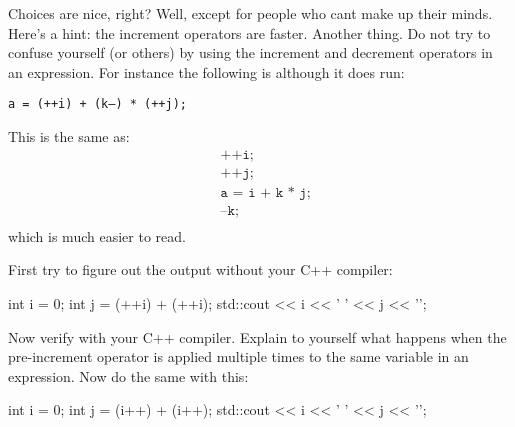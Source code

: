 Choices are nice, right? Well, except for people who cant make up their minds. Here's a hint: the increment operators are faster.
Another thing. Do not try to confuse yourself (or others) by using the increment and decrement operators in an expression. For instance the following is  although it does run:
\begin{center}
\texttt{a = (++i) + (k--) * (++j);}
\end{center}
This is the same as:
\begin{align*}
&\texttt{++i;}\\
&\texttt{++j;}\\
&\texttt{a = i + k * j;}\\
&\texttt{--k;}\\
\end{align*}
which is much easier to read.

\begin{ex}
First try to figure out the output without your C++
compiler:
\begin{console}
int i = 0;
int j = (++i) + (++i);
std::cout << i << ' ' << j << '\n';
\end{console}
\end{ex}

Now verify with your C++ compiler. Explain to yourself what happens when
the pre-increment operator is applied multiple times to the same
variable in an expression. Now do the same with this:
\begin{console}
int i = 0;
int j = (i++) + (i++);
std::cout << i << ' ' << j << '\n';
\end{console}


